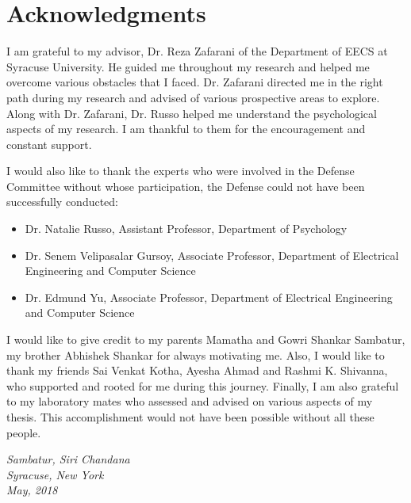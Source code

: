 \section*{Acknowledgments}

I am grateful to my advisor, Dr. Reza Zafarani of the Department of EECS at
Syracuse University. He guided me throughout my research and helped me overcome various obstacles that I faced. Dr. Zafarani directed me in the right path during my research and advised of various prospective areas to explore. Along with Dr. Zafarani, Dr. Russo helped me understand the psychological aspects of my research. I am thankful to them for the encouragement and constant support.

I would also like to thank the experts who were involved in the Defense Committee without whose participation,  the Defense could not have been successfully conducted:
\begin{itemize}
\item Dr. Natalie Russo, Assistant Professor, Department of Psychology
\item Dr. Senem Velipasalar Gursoy, Associate Professor, Department of Electrical Engineering and Computer Science
\item Dr. Edmund Yu, Associate Professor, Department of Electrical Engineering and Computer Science
\end{itemize}

I would like to give credit to my parents Mamatha and Gowri Shankar Sambatur, my brother Abhishek Shankar for always motivating me. Also, I would like to thank my friends Sai Venkat Kotha, Ayesha Ahmad and Rashmi K. Shivanna, who supported and rooted for me during this journey. Finally, I am also grateful to my laboratory mates who assessed and advised on various aspects of my thesis. This accomplishment would not have been possible without all these people. 

\hfill\emph{Sambatur, Siri Chandana}\\
\hspace*{0pt}\hfill\emph{Syracuse, New York}\\
\hspace*{0pt}\hfill\emph{May, 2018}
